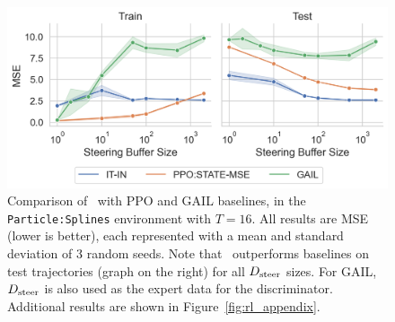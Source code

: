 \documentclass[nohyperref]{article}
\begin{document}
\begin{figure}[]
    \centering
    \includegraphics[width=\columnwidth,keepaspectratio]{figures/iclr_plots/algos_comparison_icml_main.png}
    \vspace{-1em}
    \caption{Comparison of \methodname\ with PPO and GAIL baselines, in the \texttt{Particle:Splines} environment with $T=16$. All results are MSE (lower is better), each represented with a mean and standard deviation of 3 random seeds. Note that \methodname\ outperforms baselines on test trajectories (graph on the right) for all $D_{\mathrm{steer}}$ sizes. For GAIL, $D_{\mathrm{steer}}$ is also used as the expert data for the discriminator. Additional results are shown in Figure~\ref{fig:rl_appendix}. }
    \label{fig:rl}
    \vspace{-0.5em}
\end{figure}
\end{document}
